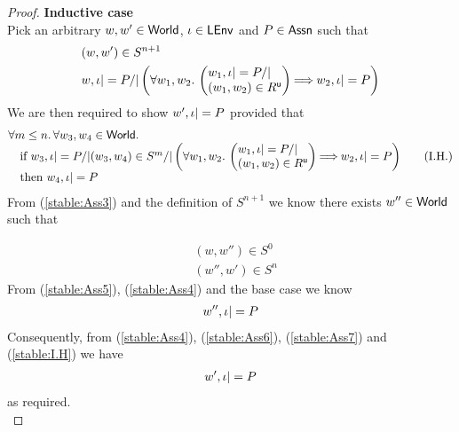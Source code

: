 \begin{lemma}[Stability]
\begin{proof}
\noindent\textbf{Inductive case}\\
Pick an arbitrary $w, w' \in \textsf{World}$, $\iota \in \textsf{LEnv}$ and $P \in \textsf{Assn}$ such that
%
\begin{align}
	& (w, w') \in S^{n+1} \label{stable:Ass3}\\
	& w, \lenv |= P /| 
		\left(
		\begin{array}{@{} l @{}}
			\for{w_1, w_2} 
			\left(
			\begin{array}{@{} l @{}}
				w_1, \lenv |= P /|\\
			 (w_1, w_2) \in \updateR  
			\end{array}
			\right)
			\!\!\implies \!\!
			w_2, \lenv |= P 
		\end{array}
		\right) \label{stable:Ass4}
\end{align}
%
We are then required to show $w', \iota |= P$ provided that
%
\begin{align}
	\begin{array}{@{} l @{}}
		\for{m \leq n} \for{w_3, w_4 \in \Worlds} \\
		\quad \text{if } w_3, \lenv |= P /| (w_3, w_4) \in S^{m} /| 
		\left(
		\begin{array}{@{} l @{}}
			\for{w_1, w_2} 
			\left(
			\begin{array}{@{} l @{}}
				w_1, \lenv |= P /|\\
			 (w_1, w_2) \in \updateR  
			\end{array}
			\right)
			\!\!\implies \!\!
			w_2, \lenv |= P 
		\end{array}
		\right)\\
		\quad \text{then } w_4, \lenv |= P
	\end{array}\tag{I.H.} \label{stable:I.H}
\end{align}
%
From (\ref{stable:Ass3}) and the definition of $S^{n+1}$ we know there exists $w'' \in \textsf{World}$ such that 

\begin{align}
	& (w, w'') \in S^{0} \label{stable:Ass5} \\
	& (w'', w') \in S^{n} \label{stable:Ass6}
\end{align}
%
From (\ref{stable:Ass5}), (\ref{stable:Ass4}) and the base case we know 
%
\begin{align}
	w'', \iota |= P \label{stable:Ass7}
\end{align}
%
Consequently, from (\ref{stable:Ass4}), (\ref{stable:Ass6}), (\ref{stable:Ass7}) and (\ref{stable:I.H}) we have
%
\begin{align*}
	w', \iota |= P
\end{align*}
as required.\\


\end{proof}
\end{lemma}
